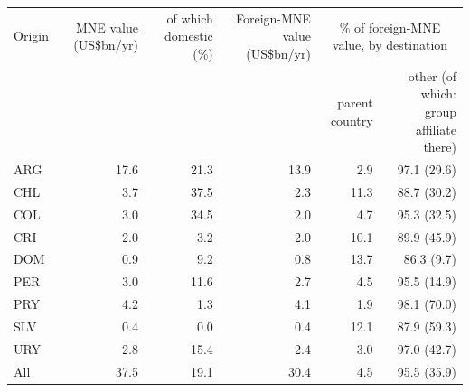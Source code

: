 \begin{tabular}{lrrrrr}
\toprule
Origin & MNE value (US\$bn/yr) & of which domestic (\%) & Foreign-MNE value (US\$bn/yr) & \multicolumn{2}{c}{\% of foreign-MNE value, by destination} \\
 & & & & parent country & other (of which: group affiliate there) \\
\midrule
ARG & 17.6 & 21.3 & 13.9 & 2.9 & 97.1 (29.6) \\
CHL & 3.7 & 37.5 & 2.3 & 11.3 & 88.7 (30.2) \\
COL & 3.0 & 34.5 & 2.0 & 4.7 & 95.3 (32.5) \\
CRI & 2.0 & 3.2 & 2.0 & 10.1 & 89.9 (45.9) \\
DOM & 0.9 & 9.2 & 0.8 & 13.7 & 86.3 (9.7) \\
PER & 3.0 & 11.6 & 2.7 & 4.5 & 95.5 (14.9) \\
PRY & 4.2 & 1.3 & 4.1 & 1.9 & 98.1 (70.0) \\
SLV & 0.4 & 0.0 & 0.4 & 12.1 & 87.9 (59.3) \\
URY & 2.8 & 15.4 & 2.4 & 3.0 & 97.0 (42.7) \\
\midrule
All & 37.5 & 19.1 & 30.4 & 4.5 & 95.5 (35.9) \\
\bottomrule
\end{tabular}

